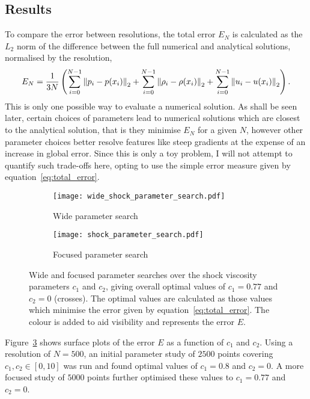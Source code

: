 \subsection{Results}

To compare the error between resolutions, the total error $E_N$ is calculated as the $L_2$ norm of the difference between the full numerical and analytical solutions, normalised by the resolution,
\begin{equation}
  \label{eq:total_error}
E_N = \frac{1}{3N} \left(
\sum_{i=0}^{N-1} \left\lVert p_i - p(x_i)\right\rVert_2
+ \sum_{i=0}^{N-1} \left\lVert\rho_i - \rho(x_i)\right\rVert_2
+ \sum_{i=0}^{N-1} \left\lVert u_i - u(x_i)\right\rVert_2 \right).
\end{equation}
This is only one possible way to evaluate a numerical solution. As shall be seen later, certain choices of parameters lead to numerical solutions which are closest to the analytical solution, that is they minimise $E_N$ for a given $N$, however other parameter choices better resolve features like steep gradients at the expense of an increase in global error. Since this is only a toy problem, I will not attempt to quantify such trade-offs here, opting to use the simple error measure given by equation~\ref{eq:total_error}.

\begin{figure}[t]
    \hfill
    \begin{subfigure}{0.49\textwidth}
      \centering
      \texttt{[image: wide\_shock\_parameter\_search.pdf]}
      \caption{Wide parameter search}%
      \label{fig:wide_shock_parameter_search}
    \end{subfigure}
    \hfill
    \begin{subfigure}{0.49\textwidth}
      \texttt{[image: shock\_parameter\_search.pdf]}
      \caption{Focused parameter search}%
      \label{fig:shock_parameter_search}
    \end{subfigure}
    \caption{Wide and focused parameter searches over the shock viscosity parameters $c_1$ and $c_2$, giving overall optimal values of $c_1 = 0.77$ and $c_2 = 0$ (crosses). The optimal values are calculated as those values which minimise the error given by equation~\ref{eq:total_error}. The colour is added to aid visibility and represents the error $E$. }
\label{fig:shock_parameter_searches}%
\end{figure}

Figure~\ref{fig:shock_parameter_searches} shows surface plots of the error $E$ as a function of $c_1$ and $c_2$. Using a resolution of $N=500$, an initial parameter study of $2500$ points covering $c_1, c_2 \in [0, 10]$ was run and found optimal values of $c_1 = 0.8$ and $c_2 = 0$. A more focused study of $5000$ points further optimised these values to $c_1 = 0.77$ and $c_2 = 0$.

